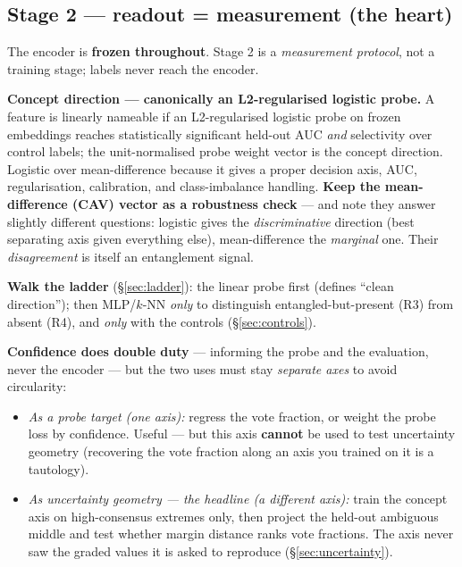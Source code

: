 \documentclass[11pt,a4paper]{article}
\begin{document}
\subsection{Stage 2 --- readout = measurement (the heart)}

The encoder is \textbf{frozen throughout}. Stage 2 is a \emph{measurement protocol}, not a
training stage; labels never reach the encoder.

\begin{decidedbox}
\textbf{Concept direction --- canonically an L2-regularised logistic probe.} A feature is
linearly nameable if an L2-regularised logistic probe on frozen embeddings reaches
statistically significant held-out AUC \emph{and} selectivity over control labels; the
unit-normalised probe weight vector is the concept direction. Logistic over mean-difference
because it gives a proper decision axis, AUC, regularisation, calibration, and class-imbalance
handling. \textbf{Keep the mean-difference (CAV) vector as a robustness check} --- and note they
answer slightly different questions: logistic gives the \emph{discriminative} direction (best
separating axis given everything else), mean-difference the \emph{marginal} one. Their
\emph{disagreement} is itself an entanglement signal.
\end{decidedbox}

\textbf{Walk the ladder} (\S\ref{sec:ladder}): the linear probe first (defines ``clean
direction''); then MLP/$k$-NN \emph{only} to distinguish entangled-but-present (R3) from absent
(R4), and \emph{only} with the controls (\S\ref{sec:controls}).

\textbf{Confidence does double duty} --- informing the probe and the evaluation, never the
encoder --- but the two uses must stay \emph{separate axes} to avoid circularity:
\begin{itemize}[leftmargin=1.4em,itemsep=2pt]
\item \emph{As a probe target (one axis):} regress the vote fraction, or weight the probe loss
by confidence. Useful --- but this axis \textbf{cannot} be used to test uncertainty geometry
(recovering the vote fraction along an axis you trained on it is a tautology).
\item \emph{As uncertainty geometry --- the headline (a different axis):} train the concept axis
on high-consensus extremes only, then project the held-out ambiguous middle and test whether
margin distance ranks vote fractions. The axis never saw the graded values it is asked to
reproduce (\S\ref{sec:uncertainty}).
\end{itemize}
\end{document}
